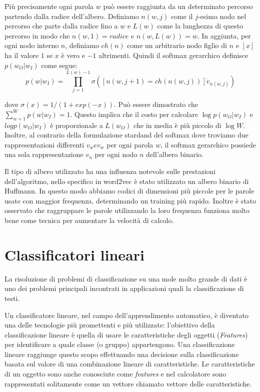 \documentclass[a4paper,12pt,openright,twoside]{report}
\theoremstyle{definition}
\begin{document}
Più precisamente ogni parola $w$ può essere raggiunta da un determinato percorso partendo dalla radice
dell'albero. Definiamo $n(w,j)$ come il $j$-esimo nodo nel percorso che parte dalla radice fino a $w$ e $L(w)$ come
la lunghezza di questo percorso in modo che $n(w,1) = radice$ e $n(w,L(w)) = w$.
In aggiunta, per ogni nodo interno $n$, definiamo $ch(n)$ come un arbitrario nodo figlio di $n$ e $[x]$ ha il valore $1$ se $x$ è vero e $-1$ altrimenti.
Quindi il softmax gerarchico definisce $p(w_O|w_I)$ come segue:
\begin{equation}
	p(w|w_I) = \prod_{j=1}^{L(w)-1}\sigma([n(w,j+1)=ch(n(w,j))]\dot v_{n(w,j)} )
	\label{eq:hierarchicalSoftmax}
\end{equation}

dove $\sigma(x) = 1/(1+exp(-x))$. Può essere dimostrato che $\sum_{w=1}^W p(w|w_I) = 1$. Questo implica
che il costo per calcolare $\log p(w_O|w_I)$ e $log p(w_O|w_I)$ è proporzionale a $L(w_O)$ che in media
è più piccolo di $\log W$.
Inoltre, al contrario della formulazione stardand del softmax dove troviamo due rappresentazioni differenti 
$v_w e v_w$ per ogni parola $w$, il softmax gerarchico possiede una sola rappresentazione $v_n$ per ogni nodo $n$
dell'albero binario.

Il tipo di albero utilizzato ha una influenza notevole sulle prestazioni dell'algoritmo, nello specifico
in word2vec è stato utilizzato un albero binario di Huffmann. In questo modo 
abbiamo codici di dimensioni più piccole per le parole usate con maggior frequenza,
determinando un training più rapido.
Inoltre è stato osservato che raggruppare le parole utilizzando la loro frequenza funziona molto
bene come tecnica per aumentare la velocità di calcolo.

\section{Classificatori lineari}
La risoluzione di problemi di classificazione su una mole molto grande di dati è uno dei problemi principali
incontrati in applicazioni quali la classificazione di testi.

Un classificatore lineare, nel campo dell'apprendimento automatico, è diventato una delle tecnologie più
promettenti e più utilizzate: l'obiettivo della 
classificazione lineare è quella di usare le caratteristiche degli oggetti (\emph{Features}) per identificare
a quale classe (o gruppo) appartengono. 
Una classificazione lineare raggiunge questo scopo effettuando una decisione sulla classificazione basata sul valore di una combinazione lineare di caratteristiche. 
Le caratteristiche di un oggetto sono anche conosciute come \emph{features} e nel calcolatore sono rappresentati solitamente come un vettore chiamato vettore delle caratteristiche.
\end{document}
